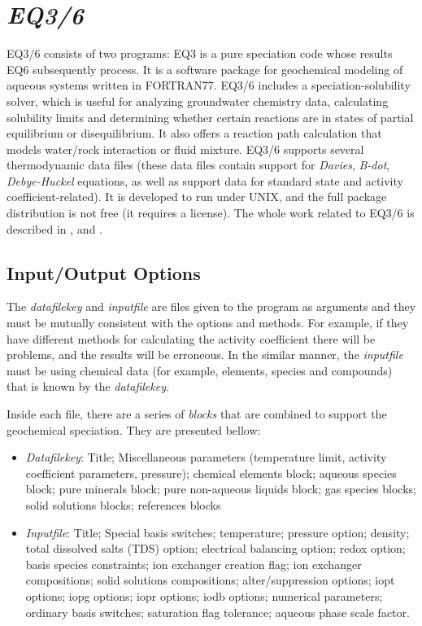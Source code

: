 
\section{\emph{EQ3/6}}
EQ3/6 consists of two programs: EQ3 is a pure speciation code whose results EQ6 subsequently process. It is a software package for geochemical modeling of aqueous systems written in FORTRAN77. 
EQ3/6 includes a speciation-solubility solver, which is useful for analyzing groundwater chemistry data, calculating solubility limits and determining whether certain reactions are in states of partial equilibrium or disequilibrium. It also offers a reaction path calculation that models water/rock interaction or fluid mixture. 
EQ3/6 supports several thermodynamic data files (these data files contain support for \emph{Davies}, \emph{B-dot}, \emph{Debye-Huckel} equations, as well as support data for standard state and activity coefficient-related). 
It is developed to run under UNIX, and the full package distribution is not free (it requires a license). The whole work related to EQ3/6 is described in \cite{Wolery:1979}, \cite{Wolery:1990} and \cite{Wolery:1992}.

\subsection{Input/Output Options}
The \emph{datafilekey} and \emph{inputfile} are files given to the program as arguments and they must be mutually consistent with the options and methods. For example, if they have different methods for calculating the activity coefficient there will be problems, and the results will be erroneous. In the similar manner, the \emph{inputfile} must be using chemical data (for example, elements, species and compounds) that is known by the \emph{datafilekey}.

Inside each file, there are a series of \emph{blocks} that are combined to support the geochemical speciation. They are presented bellow:
\begin{itemize}
\item \emph{Datafilekey}: Title; Miscellaneous parameters (temperature limit, activity coefficient parameters, pressure); chemical elements block; aqueous species block; pure minerals block; pure non-aqueous liquids block; gas species blocks; solid solutions blocks; references blocks
\item \emph{Inputfile}: Title; Special basis switches; temperature; pressure option; density; total dissolved salts (TDS) option; electrical balancing option; redox option; basis species constraints; ion exchanger creation flag; ion exchanger compositions; solid solutions compositions; alter/suppression options; iopt options; iopg options; iopr options; iodb options; numerical parameters; ordinary basis switches; saturation flag tolerance; aqueous phase scale factor.
\end{itemize}

